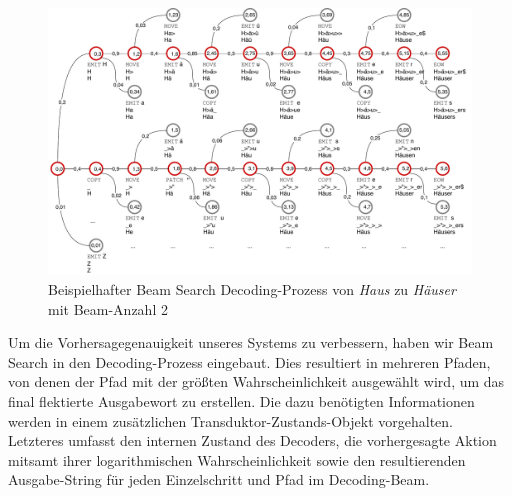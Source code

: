 \documentclass[11pt,a4paper]{article}
\begin{document}
\begin{figure}
  \centering
  \includegraphics[width=\textwidth-\baselineskip-\abovecaptionskip-\belowcaptionskip,keepaspectratio]{beam_search}
  \caption{Beispielhafter Beam Search Decoding-Prozess von \textit{Haus} zu \textit{Häuser} mit Beam-Anzahl 2}
  \label{fig:beam}
\end{figure}

Um die Vorhersagegenauigkeit unseres Systems zu verbessern, haben wir Beam Search in den Decoding-Prozess eingebaut.
Dies resultiert in mehreren Pfaden, von denen der Pfad mit der größten Wahrscheinlichkeit ausgewählt wird, um das final flektierte Ausgabewort zu erstellen.
Die dazu benötigten Informationen werden in einem zusätzlichen Transduktor-Zustands-Objekt vorgehalten.
Letzteres umfasst den internen Zustand des Decoders, die vorhergesagte Aktion mitsamt ihrer logarithmischen Wahrscheinlichkeit sowie den resultierenden Ausgabe-String für jeden Einzelschritt und Pfad im Decoding-Beam.
\end{document}
